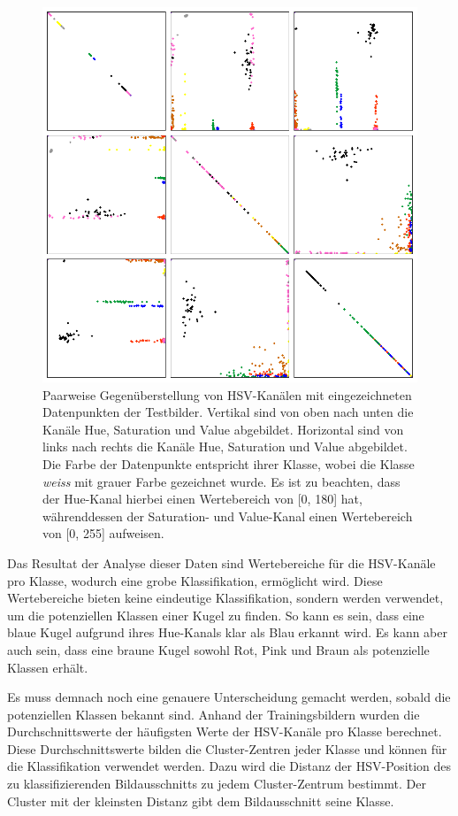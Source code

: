 \begin{figure}[h!]
    \begin{center}
        \includegraphics[width=0.7\linewidth]{../common/03_billiard_ai/resources/classification/Cluster_all.png}
    \end{center}
    \caption{
        Paarweise Gegenüberstellung von HSV-Kanälen mit eingezeichneten Datenpunkten der Testbilder.
        Vertikal sind von oben nach unten die Kanäle Hue, Saturation und Value abgebildet.
        Horizontal sind von links nach rechts die Kanäle Hue, Saturation und Value abgebildet.
        Die Farbe der Datenpunkte entspricht ihrer Klasse, wobei die Klasse \emph{weiss} mit grauer Farbe gezeichnet wurde.
        Es ist zu beachten, dass der Hue-Kanal hierbei einen Wertebereich von [0, 180] hat, währenddessen
        der Saturation- und Value-Kanal einen Wertebereich von [0, 255] aufweisen.
    }
    \label{fig:klassifikation_cluster}
\end{figure}

Das Resultat der Analyse dieser Daten sind Wertebereiche für die HSV-Kanäle pro Klasse, wodurch eine grobe Klassifikation,
ermöglicht wird.
Diese Wertebereiche bieten keine eindeutige Klassifikation, sondern werden verwendet, um die potenziellen
Klassen einer Kugel zu finden.
So kann es sein, dass eine blaue Kugel aufgrund ihres Hue-Kanals klar als Blau erkannt wird.
Es kann aber auch sein, dass eine braune Kugel sowohl Rot, Pink und Braun als potenzielle Klassen erhält.

Es muss demnach noch eine genauere Unterscheidung gemacht werden, sobald die potenziellen Klassen bekannt sind.
Anhand der Trainingsbildern wurden die Durchschnittswerte der häufigsten Werte der HSV-Kanäle pro Klasse berechnet.
Diese Durchschnittswerte bilden die Cluster-Zentren jeder Klasse und können für die Klassifikation verwendet werden.
Dazu wird die Distanz der HSV-Position des zu klassifizierenden Bildausschnitts zu jedem Cluster-Zentrum bestimmt.
Der Cluster mit der kleinsten Distanz gibt dem Bildausschnitt seine Klasse.

